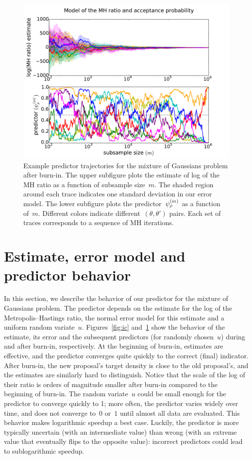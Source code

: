 \documentclass[angelino.tex]{subfiles}
\begin{document}
\begin{figure}[h!]
\centering
\includegraphics[width=\textwidth]{figs/mix-mle-traces.pdf}
\caption{Example predictor trajectories for the mixture of Gaussians problem
after burn-in.
The upper subfigure plots the estimate of log of the MH ratio
as a function of subsample size~$m$.
The shaded region around each trace indicates one standard deviation in our error model.
The lower subfigure plots the predictor~$\psi_{\rho}^{(m)}$ as a function of~$m$.
Different colors indicate different~$(\theta, \theta')$ pairs.
Each set of traces corresponds to a sequence of MH iterations.}
\label{fig:mle}
\end{figure}

\section{Estimate, error model and predictor behavior}
\label{sec:predictor-behavior}

In this section, we describe the behavior of our predictor
for the mixture of Gaussians problem.
The predictor depends on the estimate for the log of the Metropolis--Hastings
ratio, the normal error model for this estimate and a uniform random variate~$u$.
Figures~\ref{fig:ic} and~\ref{fig:mle} show the behavior of the estimate,
its error and the subsequent predictors (for randomly chosen~$u$)
during and after burn-in, respectively.
%
At the beginning of burn-in, estimates are effective, and the predictor
converges quite quickly to the correct (final) indicator.
After burn-in, the new proposal's target density is close to the old proposal's,
and the estimates are similarly hard to distinguish.
%
Notice that the scale of the log of their ratio is orders of magnitude smaller
after burn-in compared to the beginning of burn-in.
The random variate~$u$ could be small enough for the predictor to
converge quickly to 1; more often, the predictor varies widely over time,
and does not converge to~$0$ or~$1$ until almost all data are evaluated.
This behavior makes logarithmic speedup a best case.
Luckily, the predictor is more typically uncertain (with an intermediate value)
than wrong (with an extreme value that eventually flips to the opposite value):
incorrect predictors could lead to sublogarithmic speedup.
\end{document}
